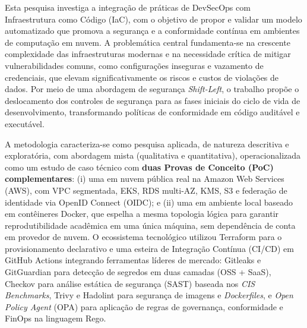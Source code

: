 \begin{resumo}
Esta pesquisa investiga a integração de práticas de DevSecOps com Infraestrutura como Código (IaC), com o objetivo de propor e validar um modelo automatizado que promova a segurança e a conformidade contínua em ambientes de computação em nuvem. A problemática central fundamenta-se na crescente complexidade das infraestruturas modernas e na necessidade crítica de mitigar vulnerabilidades comuns, como configurações inseguras e vazamento de credenciais, que elevam significativamente os riscos e custos de violações de dados. Por meio de uma abordagem de segurança \textit{Shift-Left}, o trabalho propõe o deslocamento dos controles de segurança para as fases iniciais do ciclo de vida de desenvolvimento, transformando políticas de conformidade em código auditável e executável.

A metodologia caracteriza-se como pesquisa aplicada, de natureza descritiva e exploratória, com abordagem mista (qualitativa e quantitativa), operacionalizada como um estudo de caso técnico com \textbf{duas Provas de Conceito (PoC) complementares}: (i) uma em nuvem pública real na Amazon Web Services (AWS), com VPC segmentada, EKS, RDS multi-AZ, KMS, S3 e federação de identidade via OpenID Connect (OIDC); e (ii) uma em ambiente local baseado em contêineres Docker, que espelha a mesma topologia lógica para garantir reprodutibilidade acadêmica em uma única máquina, sem dependência de conta em provedor de nuvem. O ecossistema tecnológico utilizou Terraform para o provisionamento declarativo e uma esteira de Integração Contínua (CI/CD) em GitHub Actions integrando ferramentas líderes de mercado: Gitleaks e GitGuardian para detecção de segredos em duas camadas (OSS + SaaS), Checkov para análise estática de segurança (SAST) baseada nos \textit{CIS Benchmarks}, Trivy e Hadolint para segurança de imagens e \textit{Dockerfiles}, e \textit{Open Policy Agent} (OPA) para aplicação de regras de governança, conformidade e FinOps na linguagem Rego.


\end{resumo}
